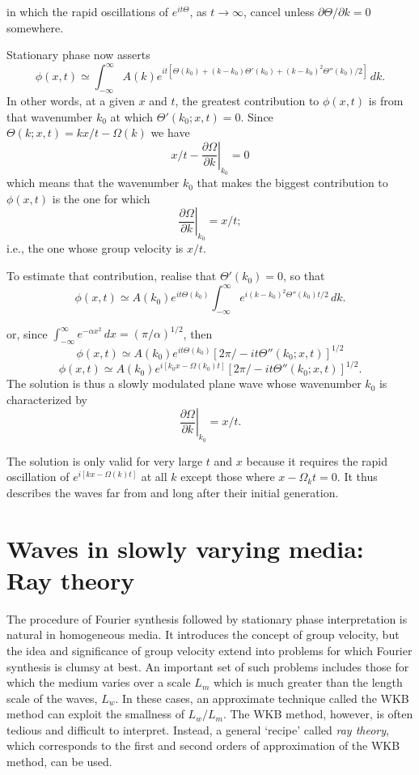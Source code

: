 
in which the rapid oscillations of $e^{it\Theta}$, as $t\to\infty$, cancel unless
$\partial\Theta/\partial k=0$ somewhere.

Stationary phase now asserts
\[
	\phi(x,t)\simeq\int_{-\infty}^{\infty}A(k)
	e^{it[\Theta(k_0)+(k-k_0)\Theta'(k_0)
					+(k-k_0)^2\Theta''(k_0)/2]}\,dk.
\]
In other words, at a given $x$ and $t$, the greatest contribution to $\phi(x,t)$ is from
that wavenumber $k_0$ at which $\Theta'(k_0;x,t)=0$. Since
$\Theta(k;x,t)=kx/t-\Omega(k)$ we have
\[
	x/t-\left.\frac{\partial\Omega}{\partial k}\right|_{k_0}=0
\]
which means that the wavenumber $k_0$ that makes the biggest contribution to
$\phi(x,t)$ is the one for which
\[
	\left.\frac{\partial\Omega}{\partial k}\right|_{k_0}=x/t;
\]
i.e., the one whose group velocity is $x/t$.

To estimate that contribution, realise that $\Theta'(k_0)=0$, so that
\[
	\phi(x,t)\simeq A(k_0)e^{it\Theta(k_0)}
	\int_{-\infty}^{\infty}
	e^{i(k-k_0)^2\Theta''(k_0)t/2}\,dk.
\]

\sourcepagebreak

or, since $\int_{-\infty}^{\infty}e^{-\alpha x^2}\,dx=(\pi/\alpha)^{1/2}$, then
\[
	\phi(x,t)\simeq A(k_0)e^{it\Theta(k_0)}
		[2\pi/-it\Theta''(k_0;x,t)]^{1/2}
\]
\[
	\phi(x,t)\simeq A(k_0)e^{i[k_0x-\Omega(k_0)t]}
		[2\pi/-it\Theta''(k_0;x,t)]^{1/2}.
\]
The solution is thus a slowly modulated plane wave whose wavenumber $k_0$ is
characterized by
\[
	\left.\frac{\partial\Omega}{\partial k}\right|_{k_0}=x/t.
\]

The solution is only valid for very large $t$ and $x$ because it requires the rapid
oscillation of $e^{i[kx-\Omega(k)t]}$ at all $k$ except those where
$x-\Omega_k t=0$. It thus describes the waves far from and long after their initial
generation.

\section{Waves in slowly varying media: Ray theory}

The procedure of Fourier synthesis followed by stationary phase interpretation is
natural in homogeneous media. It introduces the concept of group velocity, but the idea
and significance of group velocity extend into problems for which Fourier synthesis is
clumsy at best. An important set of such problems includes those for which the medium
varies over a scale $L_m$ which is much greater than the length scale of the waves,
$L_w$. In these cases, an approximate technique called the WKB method can exploit the
smallness of $L_w/L_m$. The WKB method, however, is often tedious and difficult to
interpret. Instead, a general `recipe' called \emph{ray theory}, which corresponds to the
first and second orders of approximation of the WKB method, can be used.

